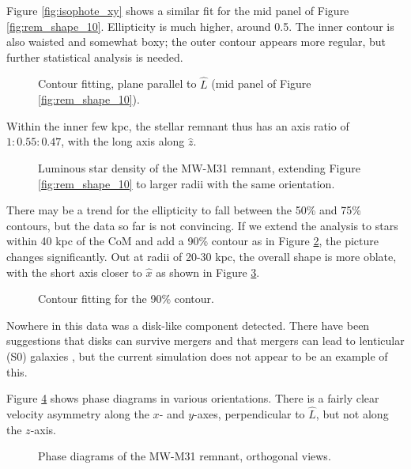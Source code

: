 \documentclass[twocolumn]{aastex63}
\begin{document}
Figure \ref{fig:isophote_xy} shows a similar fit for the mid panel of Figure \ref{fig:rem_shape_10}. Ellipticity is much higher, around 0.5. The inner contour is also waisted and somewhat boxy; the outer contour appears more regular, but further statistical analysis is needed.

\begin{figure}[htb!]
	\caption{Contour fitting, plane parallel to $\hat{L}$ (mid panel of Figure \ref{fig:rem_shape_10}).
		\label{fig:isophote_xz}}
\end{figure}

Within the inner few kpc, the stellar remnant thus has an axis ratio of $1:0.55:0.47$, with the long axis along $\hat{z}$. 

\begin{figure}[htb!]
	\caption{Luminous star density of the MW-M31 remnant, extending Figure \ref{fig:rem_shape_10} to larger radii with the same orientation.
		\label{fig:rem_shape_40}}
\end{figure}

There may be a trend for the ellipticity to fall between the 50\% and 75\% contours, but the data so far is not convincing. If we extend the analysis to stars within 40 kpc of the CoM and add a 90\% contour as in Figure \ref{fig:rem_shape_40}, the picture changes significantly. Out at radii of 20-30 kpc, the overall shape is more oblate, with the short axis closer to $\hat{x}$ as shown in Figure \ref{fig:isophotes_90}. 

\begin{figure}[htb!]
	\caption{Contour fitting for the 90\% contour.
		\label{fig:isophotes_90}}
\end{figure}

Nowhere in this data was a disk-like component detected. There have been suggestions that disks can survive mergers \citep{hopkins_how_2009, hopkins_how_2009-1} and that mergers can lead to lenticular (S0) galaxies \citep{querejeta_formation_2015}, but the current simulation does not appear to be an example of this.

Figure \ref{fig:rem_phase} shows phase diagrams in various orientations. There is a fairly clear velocity asymmetry along the $x$- and $y$-axes, perpendicular to $\hat{L}$, but not along the $z$-axis.

\begin{figure}[htb!]
	\caption{Phase diagrams of the MW-M31 remnant, orthogonal views.
	\label{fig:rem_phase}}
\end{figure}
\end{document}
